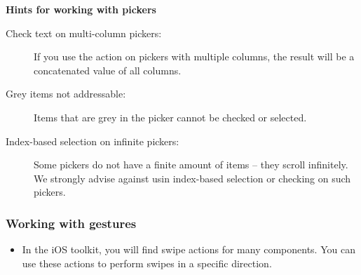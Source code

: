 \textbf{Hints for working with pickers}\\
\begin{description}
\item [Check text on multi-column pickers:]{If you use the action  on pickers with multiple columns, the result will be a concatenated value of all columns.}
\item [Grey items not addressable:]{Items that are grey in the picker cannot be checked or selected.}
\item [Index-based selection on infinite pickers:]{Some pickers do not have a finite amount of items -- they scroll infinitely. We strongly advise against usin index-based selection or checking on such pickers.}
\end{description}


\subsubsection{Working with gestures}
\begin{itemize}
\item In the iOS toolkit, you will find swipe actions for many components. You can use these actions to perform swipes in a specific direction.
\end{itemize}

